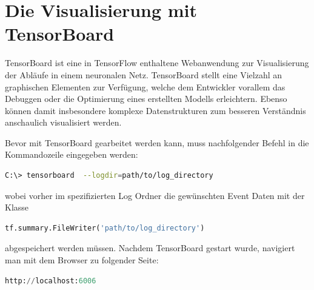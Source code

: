 \section{Die Visualisierung mit TensorBoard}

TensorBoard ist eine in TensorFlow enthaltene Webanwendung zur Visualisierung der Abläufe in einem neuronalen Netz. TensorBoard stellt eine Vielzahl an graphischen Elementen zur Verfügung, welche dem Entwickler vorallem das Debuggen oder die Optimierung eines erstellten Modells erleichtern. Ebenso können damit insbesondere komplexe Datenstrukturen zum besseren Verständnis anschaulich visualisiert werden. 

Bevor mit TensorBoard gearbeitet werden kann, muss nachfolgender Befehl in die Kommandozeile eingegeben werden:
\\

\begin{minipage}{\linewidth}
\begin{lstlisting}[language=bash, label={lst:tensorboard}]
C:\> tensorboard  --logdir=path/to/log_directory

\end{lstlisting}
\end{minipage}

\vspace{0.2cm}
wobei vorher im spezifizierten Log Ordner die gewünschten Event Daten mit der Klasse
\\

\begin{minipage}{\linewidth}
\begin{lstlisting}[language=Python, label={lst:FileWriter}]
tf.summary.FileWriter('path/to/log_directory')

\end{lstlisting}
\end{minipage}
\vspace{0.2cm}

abgespeichert werden müssen. Nachdem TensorBoard gestart wurde, navigiert man mit dem Browser zu folgender Seite:
\\

\begin{minipage}{\linewidth}
\begin{lstlisting}[language=Python, label={lst:FileWriter}]
http://localhost:6006

\end{lstlisting}
\end{minipage}
\vspace{0.2cm}

